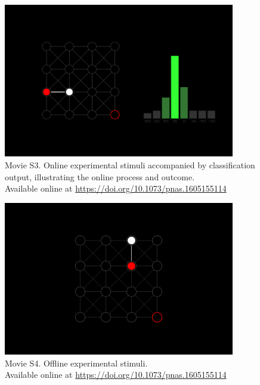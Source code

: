 \begin{figure}[t]
    \renewcommand\thefigure{\ref{chapter:nat}.M3}
    \centering
    \includegraphics[width=0.9\textwidth]{figures/nat-app-movie-s3-still.png}
    \caption[Movie S3. Online experimental stimuli accompanied by classification output, illustrating the online process and outcome.]{Movie S3. Online experimental stimuli accompanied by classification output, illustrating the online process and outcome. \\ Available online at \href{https://doi.org/10.1073/pnas.1605155114}{https://doi.org/10.1073/pnas.1605155114}}
\end{figure}

\begin{figure}[b]
    \renewcommand\thefigure{\ref{chapter:nat}.M4}
    \centering
    \includegraphics[width=0.9\textwidth]{figures/nat-app-movie-s4-still.png}
    \caption[Movie S4. Offline experimental stimuli.]{Movie S4. Offline experimental stimuli. \\ Available online at \href{https://doi.org/10.1073/pnas.1605155114}{https://doi.org/10.1073/pnas.1605155114}}
\end{figure}